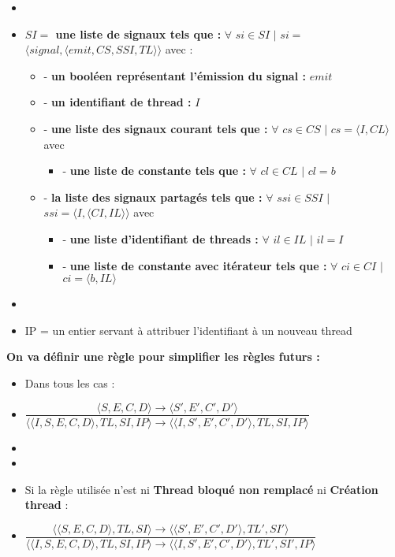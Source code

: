 \documentclass[10pt,a4paper]{article}
\begin{document}
\begin{itemize}
			\item[]
			\item[] \textbf{$SI =$ une liste de signaux tels que :} $\forall$ $si \in SI$ $|$ $si =$ $\langle signal,\langle emit,CS,SSI,TL\rangle\rangle$ avec :
			\begin{itemize}
				\item[] - \textbf{un booléen représentant l'émission du signal :} $emit$
				\item[] - \textbf{un identifiant de thread :} $I$
				\item[] - \textbf{une liste des signaux courant tels que :} $\forall$ $cs \in CS$ $|$ $cs = \langle I,CL\rangle$ avec 
				\begin{itemize}
					\item[] - \textbf{une liste de constante tels que :} $\forall$ $cl \in CL$ $|$ $cl = b$
				\end{itemize}
			
				\item[] - \textbf{la liste des signaux partagés tels que :} $\forall$ $ssi \in SSI$ $|$ $ssi = \langle I,\langle CI,IL\rangle\rangle$ avec 
				\begin{itemize}
					\item[] - \textbf{une liste d'identifiant de threads :} $\forall$ $il \in IL$ $|$ $il = I$
					\item[] - \textbf{une liste de constante avec itérateur tels que :} $\forall$ $ci \in CI$ $|$ $ci = \langle b, IL\rangle$
				\end{itemize}
			\end{itemize}
			\item[]
			\item[] IP = un entier servant à attribuer l'identifiant à un nouveau thread 
		\end{itemize}
		\bigbreak
		
		\textbf{On va définir une règle pour simplifier les règles futurs :} 
		\begin{itemize}
			\item[] Dans tous les cas :
			\item[] \begin{center}
						$\dfrac{\langle S,E,C,D\rangle \rightarrow \langle S',E',C',D'\rangle}{\langle\langle I,S,E,C,D\rangle,TL,SI,IP\rangle \rightarrow \langle\langle I,S',E',C',D'\rangle,TL,SI,IP\rangle}$
					\end{center}
			\item[]
			\item[]
			\item[] Si la règle utilisée n'est ni \textbf{Thread bloqué non remplacé} ni \textbf{Création thread} :
			\smallbreak 
			\item[] \begin{center}
						$\dfrac{\langle\langle S,E,C,D\rangle,TL,SI\rangle \rightarrow \langle\langle S',E',C',D'\rangle,TL',SI'\rangle}{\langle\langle I,S,E,C,D\rangle,TL,SI,IP\rangle \rightarrow \langle\langle I,S',E',C',D'\rangle,TL',SI',IP\rangle}$ 
					\end{center}
		\end{itemize}
		\newpage
		
\end{document}
